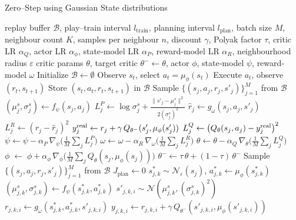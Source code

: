 \documentclass[11pt,a4paper]{report}
\begin{document}
\begin{algorithm}[ht]
\caption{Zero–Step using Gaussian State distributions}
\label{alg:zero_step_det_reward}
\begin{algorithmic}[1]
\Require 
  replay buffer $\mathcal B$, play–train interval $l_{\text{train}}$, planning interval $l_{\text{plan}}$, batch size $M$, neighbour count $K$, samples per neighbour $n$, discount $\gamma$, Polyak factor $\tau$,  
  critic LR $\alpha_Q$, actor LR $\alpha_\phi$,  
  state‐model LR $\alpha_P$, reward‐model LR $\alpha_R$, neighbourhood radius $\varepsilon$
\Ensure 
  critic params $\theta$, target critic $\theta^-\!\gets\theta$, actor $\phi$,  
  state‐model $\psi$, reward‐model $\omega$
\State Initialize $\mathcal B\!\gets\!\emptyset$
  \State Observe $s_t$, select $a_t=\mu_\phi(s_t)$
  \State Execute $a_t$, observe $(r_t,s_{t+1})$
  \State Store $(s_t,a_t,r_t,s_{t+1})$ in $\mathcal B$
   
    \State Sample $\{(s_j,a_j,r_j,s'_j)\}_{j=1}^M$ from $\mathcal B$
      \State $(\mu^s_j,\sigma^s_j)\gets f_\psi(s_j,a_j)$
      \State $L^P_j \gets \log\sigma^s_j + \frac{\|s'_j-\mu^s_j\|^2}{2(\sigma^s_j)^2}$
      \State $\hat r_j \gets g_\omega(s_j,a_j,s'_j)$
      \State $L^R_j \gets (r_j - \hat r_j)^2$
      \State $y^{\rm real}_j \gets r_j + \gamma\,Q_{\theta^-}(s'_j,\mu_\phi(s'_j))$
      \State $L^Q_j \gets \bigl(Q_\theta(s_j,a_j) - y^{\rm real}_j\bigr)^2$
    \EndFor
    \State $\psi \!\gets\! \psi - \alpha_P\,\nabla_\psi\bigl(\tfrac{1}{M}\sum_j L^P_j\bigr)$
    \State $\omega \!\gets\! \omega - \alpha_R\,\nabla_\omega\bigl(\tfrac{1}{M}\sum_j L^R_j\bigr)$
    \State $\theta \!\gets\! \theta - \alpha_Q\,\nabla_\theta\bigl(\tfrac{1}{M}\sum_j L^Q_j\bigr)$
    \State $\phi \;\gets\;\phi + \alpha_\phi\,\nabla_\phi\bigl(\tfrac{1}{M}\sum_j Q_\theta(s_j,\mu_\phi(s_j))\bigr)$
    \State $\theta^- \!\gets\! \tau\,\theta + (1-\tau)\,\theta^-$
  \EndIf
   
    \State Sample $\{(s_j,a_j,r_j,s'_j)\}_{j=1}^M$ from $\mathcal B$
    \State $J_{\text{plan}}\gets 0$
        \State $s^*_{j,k}\sim\mathcal N_{\varepsilon}(s_j)$, \quad $a^*_{j,k}\gets \mu_\phi(s^*_{j,k})$
        \State $(\mu^s_{j,k},\sigma^s_{j,k})\gets f_\psi(s^*_{j,k},a^*_{j,k})$
          \State $s'_{j,k,i}\sim\mathcal N(\mu^s_{j,k},(\sigma^s_{j,k})^2)$
          \State $r_{j,k,i}\gets g_\omega(s^*_{j,k},a^*_{j,k},s'_{j,k,i})$
          \State $y_{j,k,i}\gets r_{j,k,i} + \gamma\,Q_{\theta^-}(s'_{j,k,i},\mu_\phi(s'_{j,k,i}))$

\end{algorithmic}
\end{algorithm}
\end{document}
